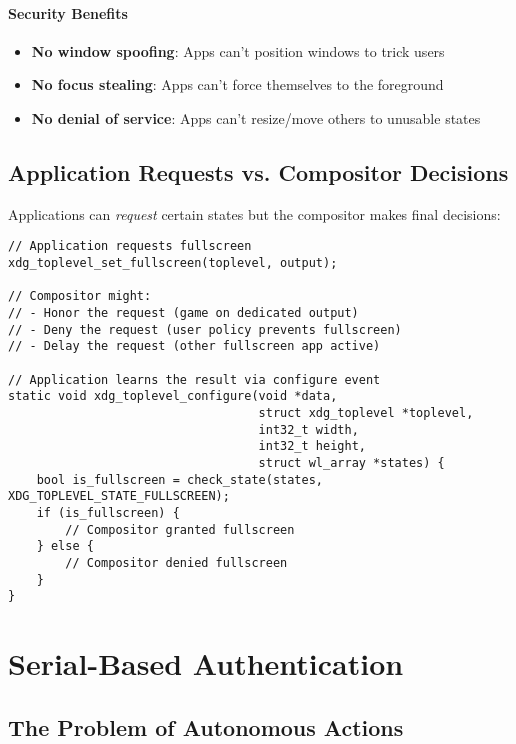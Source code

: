 \paragraph{Security Benefits}

\begin{itemize}
    \item \textbf{No window spoofing}: Apps can't position windows to trick users
    \item \textbf{No focus stealing}: Apps can't force themselves to the foreground
    \item \textbf{No denial of service}: Apps can't resize/move others to unusable states
\end{itemize}

\subsection{Application Requests vs. Compositor Decisions}

Applications can \textit{request} certain states but the compositor makes final decisions:

\begin{lstlisting}[style=cstyle, caption=Requesting Fullscreen]
// Application requests fullscreen
xdg_toplevel_set_fullscreen(toplevel, output);

// Compositor might:
// - Honor the request (game on dedicated output)
// - Deny the request (user policy prevents fullscreen)
// - Delay the request (other fullscreen app active)

// Application learns the result via configure event
static void xdg_toplevel_configure(void *data,
                                   struct xdg_toplevel *toplevel,
                                   int32_t width,
                                   int32_t height,
                                   struct wl_array *states) {
    bool is_fullscreen = check_state(states, XDG_TOPLEVEL_STATE_FULLSCREEN);
    if (is_fullscreen) {
        // Compositor granted fullscreen
    } else {
        // Compositor denied fullscreen
    }
}
\end{lstlisting}

\section{Serial-Based Authentication}

\subsection{The Problem of Autonomous Actions}

